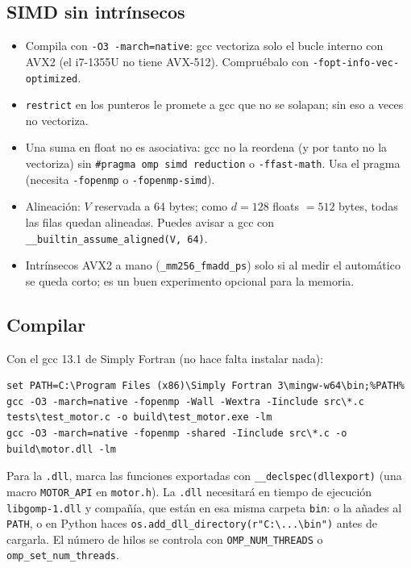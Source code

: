 \documentclass[a4paper,11pt]{article}
\newcommand{\cod}[1]{\texttt{#1}}
\begin{document}
\subsection{SIMD sin intrínsecos}
\begin{itemize}
  \item Compila con \cod{-O3 -march=native}: gcc vectoriza solo el bucle interno con AVX2 (el i7-1355U no tiene
        AVX-512). Compruébalo con \cod{-fopt-info-vec-optimized}.
  \item \cod{restrict} en los punteros le promete a gcc que no se solapan; sin eso a veces no vectoriza.
  \item Una suma en float no es asociativa: gcc no la reordena (y por tanto no la vectoriza) sin
        \cod{\#pragma omp simd reduction} o \cod{-ffast-math}. Usa el pragma (necesita \cod{-fopenmp} o \cod{-fopenmp-simd}).
  \item Alineación: $V$ reservada a 64 bytes; como $d = 128$ floats $= 512$ bytes, todas las filas quedan alineadas.
        Puedes avisar a gcc con \cod{\_\_builtin\_assume\_aligned(V, 64)}.
  \item Intrínsecos AVX2 a mano (\cod{\_mm256\_fmadd\_ps}) solo si al medir el automático se queda corto; es un buen
        experimento opcional para la memoria.
\end{itemize}

\subsection{Compilar}
Con el gcc 13.1 de Simply Fortran (no hace falta instalar nada):
\begin{lstlisting}
set PATH=C:\Program Files (x86)\Simply Fortran 3\mingw-w64\bin;%PATH%
gcc -O3 -march=native -fopenmp -Wall -Wextra -Iinclude src\*.c tests\test_motor.c -o build\test_motor.exe -lm
gcc -O3 -march=native -fopenmp -shared -Iinclude src\*.c -o build\motor.dll -lm
\end{lstlisting}
Para la \cod{.dll}, marca las funciones exportadas con \cod{\_\_declspec(dllexport)} (una macro \cod{MOTOR\_API} en
\cod{motor.h}). La \cod{.dll} necesitará en tiempo de ejecución \cod{libgomp-1.dll} y compañía, que están en esa misma
carpeta \cod{bin}: o la añades al \cod{PATH}, o en Python haces \cod{os.add\_dll\_directory(r"C:\textbackslash ...\textbackslash bin")}
antes de cargarla. El número de hilos se controla con \cod{OMP\_NUM\_THREADS} o \cod{omp\_set\_num\_threads}.

\end{document}
